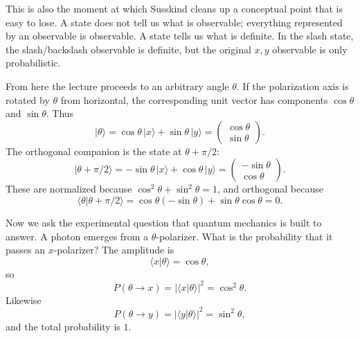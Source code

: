 This is also the moment at which Susskind cleans up a conceptual point that is easy to lose. A state does not tell us what is observable; everything represented by an observable is observable. A state tells us what is definite. In the slash state, the slash/backslash observable is definite, but the original \(x,y\) observable is only probabilistic.

From here the lecture proceeds to an arbitrary angle \(\theta\). If the polarization axis is rotated by \(\theta\) from horizontal, the corresponding unit vector has components \(\cos\theta\) and \(\sin\theta\). Thus
\begin{equation}
|\theta\rangle=\cos\theta\,|x\rangle+\sin\theta\,|y\rangle
=
\begin{pmatrix}
\cos\theta\\
\sin\theta
\end{pmatrix}.
\end{equation}
The orthogonal companion is the state at \(\theta+\pi/2\):
\begin{equation}
|\theta+\pi/2\rangle
=
-\sin\theta\,|x\rangle+\cos\theta\,|y\rangle
=
\begin{pmatrix}
-\sin\theta\\
\cos\theta
\end{pmatrix}.
\end{equation}
These are normalized because \(\cos^2\theta+\sin^2\theta=1\), and orthogonal because
\begin{equation}
\langle\theta|\theta+\pi/2\rangle
=
\cos\theta(-\sin\theta)+\sin\theta\cos\theta
=
0.
\end{equation}

Now we ask the experimental question that quantum mechanics is built to answer. A photon emerges from a \(\theta\)-polarizer. What is the probability that it passes an \(x\)-polarizer? The amplitude is
\begin{equation}
\langle x|\theta\rangle=\cos\theta,
\end{equation}
so
\begin{equation}
P(\theta\to x)=|\langle x|\theta\rangle|^2=\cos^2\theta.
\end{equation}
Likewise
\begin{equation}
P(\theta\to y)=|\langle y|\theta\rangle|^2=\sin^2\theta,
\end{equation}
and the total probability is \(1\).

